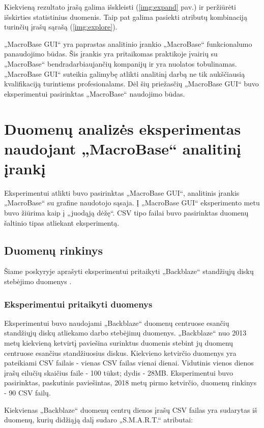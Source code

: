\documentclass{VUMIFPSkursinis}
\begin{document}
Kiekvieną rezultato įrašą galima išskleisti (\ref{img:expand} pav.) ir peržiūrėti išskirties statistinius duomenis. Taip pat galima pasiekti atributų kombinaciją turinčių įrašų sąrašą (\ref{img:explore}).\par

„MacroBase GUI“ yra paprastas analitinio įrankio „MacroBase“ funkcionalumo panaudojimo būdas. Šis įrankis yra pritaikomas praktikoje įvairių su „MacroBase“ bendradarbiaujančių kompanijų ir yra nuolatos tobulinamas. „MacroBase GUI“ suteikia galimybę atlikti analitinį darbą ne tik aukščiausią kvalifikaciją turintiems profesionalams. Dėl šių priežasčių „MacroBase GUI“ buvo eksperimentui pasirinktas „MacroBase“ naudojimo būdas.

\section{Duomenų analizės eksperimentas naudojant „MacroBase“ analitinį įrankį}
Eksperimentui atlikti buvo pasirinktas „MacroBase GUI“, analitinis įrankis „MacroBase“ su grafine naudotojo sąsaja. Į „MacroBase GUI“ eksperimento metu buvo žiūrima kaip į „juodąją dėžę“.  CSV tipo failai buvo pasirinktas duomenų šaltinio tipas atliekant eksperimentą.

\subsection{Duomenų rinkinys} \label{subsec:data}
Šiame poskyryje aprašyti eksperimentui pritaikyti „Backblaze“ standžiųjų diskų stebėjimo duomenys \cite{backblaze}.

\subsubsection{Eksperimentui pritaikyti duomenys}
Eksperimentui buvo naudojami „Backblaze“ duomenų centruose esančių standžiųjų diskų atliekamo darbo stebėjimų duomenys. „Backblaze“ nuo 2013 metų kiekvieną ketvirtį paviešina surinktus duomenis stebint jų duomenų centruose esančius standžiuosius diskus. Kiekvieno ketvirčio duomenys yra pateikiami CSV failais - vienas CSV failas vienai dienai. Vidutinis vienos dienos įrašų eilučių skaičius faile - 100 tūkst; dydis - 28MB. Eksperimentui buvo pasirinktas, paskutinis paviešintas, 2018 metų pirmo ketvirčio, duomenų rinkinys \cite{backblaze} - 90 CSV failų.

Kiekvienas „Backblaze“ duomenų centrų dienos įrašų CSV failas yra sudarytas iš duomenų, kurių didžiąją dalį sudaro „S.M.A.R.T.“ \cite{smart_meaning} atributai:
\end{document}
